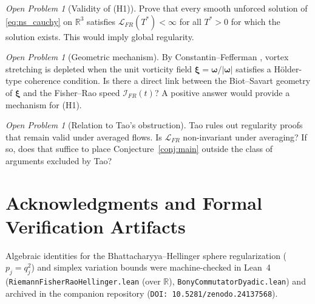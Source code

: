 \documentclass[11pt,a4paper]{article}
\theoremstyle{definition}
\theoremstyle{remark}
\newtheorem{openproblem}[theorem]{Open Problem}
\begin{document}
\begin{openproblem}[Validity of (H1)]
Prove that every smooth unforced solution of \eqref{eq:ns_cauchy} on $\mathbb{R}^3$ satisfies $\mathcal{L}_{FR}(T^*)<\infty$ for all $T^*>0$ for which the solution exists. This would imply global regularity.
\end{openproblem}

\begin{openproblem}[Geometric mechanism]
By Constantin--Fefferman \cite{ConstantinFefferman1993}, vortex stretching is depleted when the unit vorticity field $\boldsymbol{\xi}=\boldsymbol{\omega}/|\boldsymbol{\omega}|$ satisfies a H\"older-type coherence condition. Is there a direct link between the Biot--Savart geometry of $\boldsymbol{\xi}$ and the Fisher--Rao speed $\mathcal{I}_{FR}(t)$? A positive answer would provide a mechanism for (H1).
\end{openproblem}

\begin{openproblem}[Relation to Tao's obstruction]
Tao \cite{Tao2016} rules out regularity proofs that remain valid under averaged flows. Is $\mathcal{L}_{FR}$ non-invariant under averaging? If so, does that suffice to place Conjecture~\ref{conj:main} outside the class of arguments excluded by Tao?
\end{openproblem}

\section*{Acknowledgments and Formal Verification Artifacts}
Algebraic identities for the Bhattacharyya--Hellinger sphere regularization ($p_j = q_j^2$) and simplex variation bounds were machine-checked in Lean~4 (\texttt{RiemannFisherRaoHellinger.lean} (over $\mathbb{R}$), \texttt{BonyCommutatorDyadic.lean}) and archived in the companion repository (\texttt{DOI: 10.5281/zenodo.24137568}).
\end{document}

